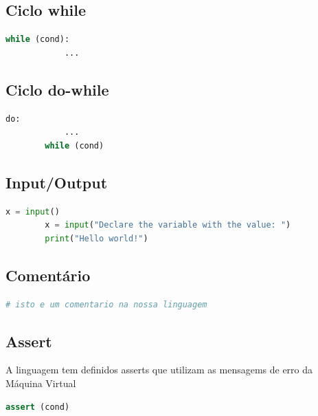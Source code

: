 \documentclass[11pt,a4paper]{report}
\begin{document}
    \subsection{Ciclo while}
    \begin{lstlisting}[language=Python]
        while (cond):
            ...
    \end{lstlisting}

    \subsection{Ciclo do-while}
    \begin{lstlisting}[language=Python]
        do:
            ...
        while (cond)
    \end{lstlisting}

    \subsection{Input/Output}
    \begin{lstlisting}[language=Python]
        x = input()
        x = input("Declare the variable with the value: ")
        print("Hello world!")
    \end{lstlisting}

    \subsection{Comentário}
    \begin{lstlisting}[language=Python]
        # isto e um comentario na nossa linguagem
    \end{lstlisting}

    \subsection{Assert}
    A linguagem tem definidos asserts que utilizam as mensagems de erro da Máquina Virtual
    \begin{lstlisting}[language=Python]
        assert (cond)
    \end{lstlisting}
\end{document}
